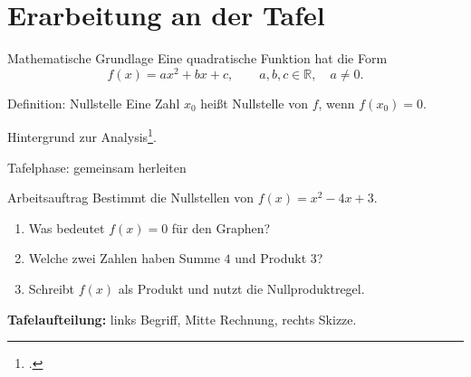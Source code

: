 \documentclass[aspectratio=169,11pt]{beamer}
\begin{document}
\section[Tafelphase]{Erarbeitung an der Tafel}
\begin{frame}{Mathematische Grundlage}
  Eine quadratische Funktion hat die Form
  \[
    f(x)=ax^2+bx+c, \qquad a,b,c\in\mathbb{R},\quad a\neq 0.
  \]
  \begin{block}{Definition: Nullstelle}
    Eine Zahl \(x_0\) heißt Nullstelle von \(f\), wenn \(f(x_0)=0\).
  \end{block}
  \small Hintergrund zur Analysis\footcite{spivak2008}.
\end{frame}

\begin{frame}{Tafelphase: gemeinsam herleiten}
  \begin{block}{Arbeitsauftrag}
    Bestimmt die Nullstellen von \(f(x)=x^2-4x+3\).
  \end{block}
  \begin{enumerate}
    \item Was bedeutet \(f(x)=0\) für den Graphen?
    \item Welche zwei Zahlen haben Summe \(4\) und Produkt \(3\)?
    \item Schreibt \(f(x)\) als Produkt und nutzt die Nullproduktregel.
  \end{enumerate}
  \medskip
  \textbf{Tafelaufteilung:} links Begriff, Mitte Rechnung, rechts Skizze.
\end{frame}
\end{document}
